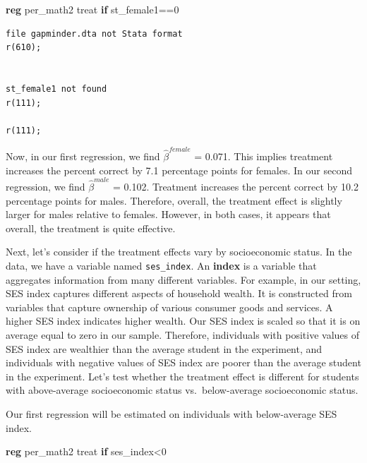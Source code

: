 \documentclass[
]{book}
\newenvironment{Shaded}{\begin{snugshade}}{\end{snugshade}}
\newcommand{\KeywordTok}[1]{\textcolor[rgb]{0.13,0.29,0.53}{\textbf{#1}}}
\newcommand{\NormalTok}[1]{#1}
\begin{document}
\begin{Shaded}
\begin{Highlighting}[]
\KeywordTok{reg}\NormalTok{ per\_math2 treat }\KeywordTok{if}\NormalTok{ st\_female1==0}
\end{Highlighting}
\end{Shaded}

\begin{verbatim}
file gapminder.dta not Stata format
r(610);


st_female1 not found
r(111);

r(111);
\end{verbatim}

Now, in our first regression, we find \(\hat{\beta}^{female}\) = 0.071. This implies treatment increases the percent correct by 7.1 percentage points for females. In our second regression, we find \(\hat{\beta}^{male}\) = 0.102. Treatment increases the percent correct by 10.2 percentage points for males. Therefore, overall, the treatment effect is slightly larger for males relative to females. However, in both cases, it appears that overall, the treatment is quite effective.

Next, let's consider if the treatment effects vary by socioeconomic status. In the data, we have a variable named \texttt{ses\_index}. An \textbf{index} is a variable that aggregates information from many different variables. For example, in our setting, SES index captures different aspects of household wealth. It is constructed from variables that capture ownership of various consumer goods and services. A higher SES index indicates higher wealth. Our SES index is scaled so that it is on average equal to zero in our sample. Therefore, individuals with positive values of SES index are wealthier than the average student in the experiment, and individuals with negative values of SES index are poorer than the average student in the experiment. Let's test whether the treatment effect is different for students with above-average socioeconomic status vs.~below-average socioeconomic status.

Our first regression will be estimated on individuals with below-average SES index.

\begin{Shaded}
\begin{Highlighting}[]
\KeywordTok{reg}\NormalTok{ per\_math2 treat }\KeywordTok{if}\NormalTok{ ses\_index\textless{}0}
\end{Highlighting}
\end{Shaded}
\end{document}
